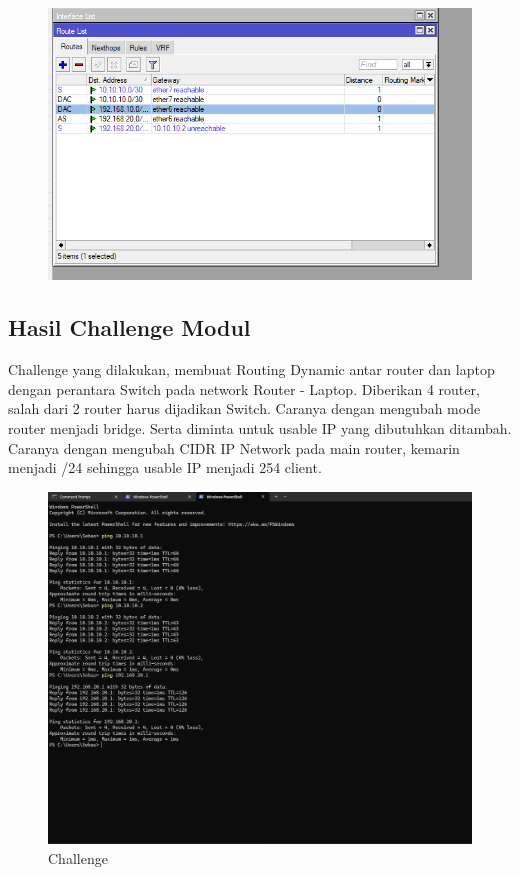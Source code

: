 \begin{figure}[H]
    \centering
    \includegraphics[width=0.5\linewidth]{P1/img/route list statis.png}
    \label{fig:enter-label}
\end{figure}
\subsection{Hasil Challenge Modul}
Challenge yang dilakukan, membuat Routing Dynamic antar router dan laptop dengan perantara Switch pada network Router - Laptop. Diberikan 4 router, salah dari 2 router harus dijadikan Switch. Caranya dengan mengubah mode router menjadi bridge. Serta diminta untuk usable IP yang dibutuhkan ditambah. Caranya dengan mengubah CIDR IP Network pada main router, kemarin menjadi /24 sehingga usable IP menjadi 254 client.
\begin{figure}[H]
    \centering
    \includegraphics[width=0.75\linewidth]{P1/img/Screenshot 2025-05-10 164954.png}
    \caption{Challenge}
    \label{fig:enter-label}
\end{figure}